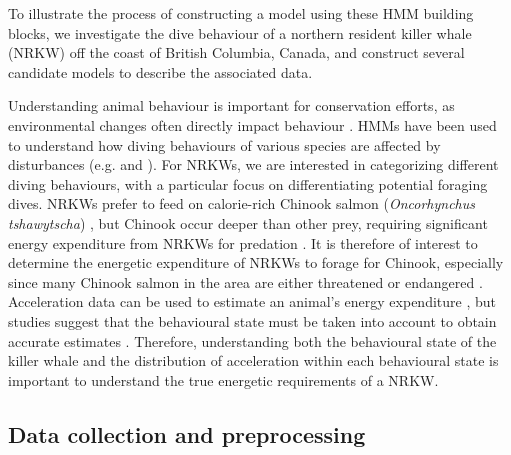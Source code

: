 

To illustrate the process of constructing a model using these HMM building blocks, we investigate the dive behaviour of a northern resident killer whale (NRKW) off the coast of British Columbia, Canada, and construct several candidate models to describe the associated data.

Understanding animal behaviour is important for conservation efforts, as environmental changes often directly impact behaviour \citep{Sutherland:1998}. HMMs have been used to understand how diving behaviours of various species are affected by disturbances (e.g. \citet{DeRuiter:2017} and \citet{Isojunno:2017}). For NRKWs, we are interested in categorizing different diving behaviours, with a particular focus on differentiating potential foraging dives. NRKWs prefer to feed on calorie-rich Chinook salmon (\textit{Oncorhynchus tshawytscha}) \citep{Ford:2006}, but Chinook occur deeper than other prey, requiring significant energy expenditure from NRKWs for predation \citep{Williams:2009,Noren:2011}. It is therefore of interest to determine the energetic expenditure of NRKWs to forage for Chinook, especially since many Chinook salmon in the area are either threatened or endangered \citep{Ford:2015}. Acceleration data can be used to estimate an animal's energy expenditure \citep{Green:2009,Wilson:2019}, but studies suggest that the behavioural state must be taken into account to obtain accurate estimates \citep{Dot:2016}. Therefore, understanding both the behavioural state of the killer whale and the distribution of acceleration within each behavioural state is important to understand the true energetic requirements of a NRKW.

\subsection{Data collection and preprocessing}

